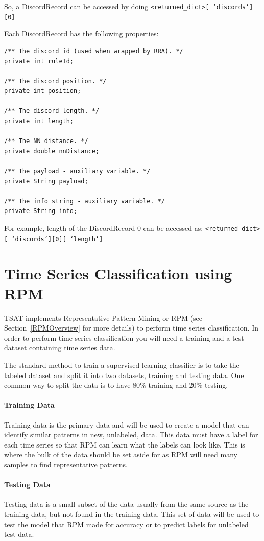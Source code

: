 \documentclass[titlepage, letterpaper, 12pt]{article}
\def\bsq#1{%
	\lq{#1}\rq}
\begin{document}
So, a DiscordRecord can be accessed by doing 
\texttt{<returned\_dict>[\bsq{discords}][0]}

Each DiscordRecord has the following properties:
\begin{lstlisting}
/** The discord id (used when wrapped by RRA). */
private int ruleId;

/** The discord position. */
private int position;

/** The discord length. */
private int length;

/** The NN distance. */
private double nnDistance;

/** The payload - auxiliary variable. */
private String payload;

/** The info string - auxiliary variable. */
private String info;

\end{lstlisting}

For example, length of the DiscordRecord 0 can be accessed as:
\texttt{<returned\_dict>[\bsq{discords}][0][\bsq{length}]}


\section{Time Series Classification using RPM}
\label{ClassGuide}
TSAT implements Representative Pattern Mining or RPM  (see Section~\ref{RPMOverview} for more details) to perform time series classification.  In order to perform time series classification you will need a training and a test dataset containing time series data.

The standard method to train a supervised learning classifier is to take the labeled dataset and split it into two datasets, training and testing data.  One common way to split the data is to have 80\% training and 20\% testing.  

\paragraph{Training Data}
Training data is the primary data and will be used to create a model that can identify similar patterns in new, unlabeled, data. This data must have a label for each time series so that RPM can learn what the labels can look like. This is where the bulk of the data should be set aside for as RPM will need many samples to find representative patterns.

\paragraph{Testing Data}
Testing data is a small subset of the data usually from the same source as the training data, but not found in the training data. This set of data will be used to test the model that RPM made for accuracy or to predict labels for unlabeled test data.
\end{document}
